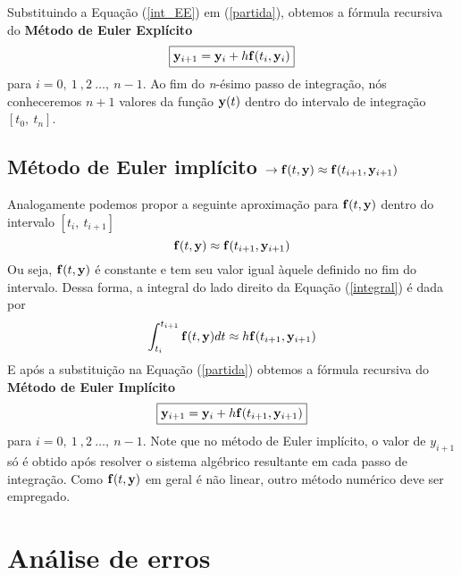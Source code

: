 \documentclass[12pt]{peqdoc}
\begin{document}
	Substituindo a Equação (\ref{int_EE}) em (\ref{partida}), obtemos a fórmula recursiva do \textbf{Método de Euler Explícito}
	\begin{equation}
	\boxed{\mathbf{y}_{i+1} = \mathbf{y}_i + h\mathbf{f}(t_i,\mathbf{y}_i)}\label{EulerE}
	\end{equation}
	\noindent para $i=0,\ 1\ ,2\ \ldots,\ n-1$. Ao fim do \textit{n}-ésimo passo de integração, nós conheceremos $n+1$ valores da função $\mathbf{y}(t)$ dentro do intervalo de integração $[t_0,\ t_n]$.
	
	\subsection{Método de Euler implícito $\rightarrow\mathbf{f}(t,\mathbf{y})\approx \mathbf{f}(t_{i+1},\mathbf{y}_{i+1})$}
	
	Analogamente podemos propor a seguinte aproximação para $\mathbf{f}(t,\mathbf{y})$ dentro do intervalo $[t_i,\ t_{i+1}]$
	\begin{equation}
	\mathbf{f}(t,\mathbf{y})\approx \mathbf{f}(t_{i+1},\mathbf{y}_{i+1})
	\end{equation}
	\noindent Ou seja, $\mathbf{f}(t,\mathbf{y})$ é constante e tem seu valor igual àquele definido no fim do intervalo. Dessa forma, a integral do lado direito da Equação (\ref{integral}) é dada por
	\begin{equation}
	\int_{t_i}^{t_{i+1}}{\mathbf{f}(t,\mathbf{y})dt} \approx h\mathbf{f}(t_{i+1},\mathbf{y}_{i+1})\label{int_EI}
	\end{equation}
	\noindent E após a substituição na Equação (\ref{partida}) obtemos a fórmula recursiva do \textbf{Método de Euler Implícito}
	\begin{equation}
	\boxed{\mathbf{y}_{i+1} = \mathbf{y}_i + h\mathbf{f}(t_{i+1},\mathbf{y}_{i+1})}\label{EulerI}
	\end{equation}
	\noindent para $i=0,\ 1\ ,2\ \ldots,\ n-1$. Note que no método de Euler implícito, o valor de $y_{i+1}$ só é obtido após resolver o sistema algébrico resultante em cada passo de integração. Como $\mathbf{f}(t,\mathbf{y})$ em geral é não linear, outro método numérico deve ser empregado.
	
	\section{Análise de erros}
	
\end{document}
